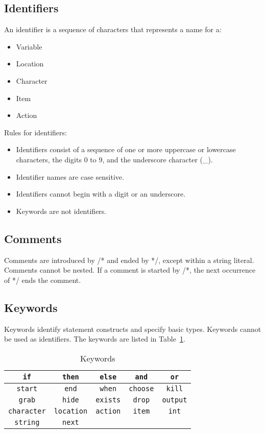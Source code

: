 \documentclass[12pt]{article}
\begin{document}
\subsection{Identifiers}
An identifier is a sequence of characters that represents a name for a:
\begin{itemize}
\item Variable
\item Location
\item Character
\item Item
\item Action
\end{itemize}

\noindent Rules for identifiers:
\begin{itemize}
\item Identifiers consist of a sequence of one or more uppercase or lowercase characters, the digits 0 to 9, and the underscore character (\_).
\item Identifier names are case sensitive.
\item Identifiers cannot begin with a digit or an underscore.
\item Keywords are not identifiers.
\end{itemize}

\subsection{Comments}
Comments are introduced by /* and ended by */, except within a string literal.
Comments cannot be nested.  If a comment is started by /*, the next occurrence of */ ends the comment.

\subsection{Keywords}
Keywords identify statement constructs and specify basic types.  Keywords cannot be used as identifiers.  The keywords are listed in Table~\ref{keywords}.

\begin{table}[htdp]
\caption{Keywords}
\begin{center}
\begin{tabular}{|c|c|c|c|c|}
\hline
\texttt{if} & \texttt{then} & \texttt{else} & \texttt{and} & \texttt{or} \\
\hline
\texttt{start} & \texttt{end} & \texttt{when} & \texttt{choose} & \texttt{kill} \\
\hline
\texttt{grab} & \texttt{hide} & \texttt{exists} & \texttt{drop} & \texttt{output} \\
\hline
\texttt{character} & \texttt{location} & \texttt{action} & \texttt{item} & \texttt{int} \\
\hline
\texttt{string} & \texttt{next} & & &  \\
\hline
\end{tabular}
\end{center}
\label{keywords}
\end{table}%
\end{document}
